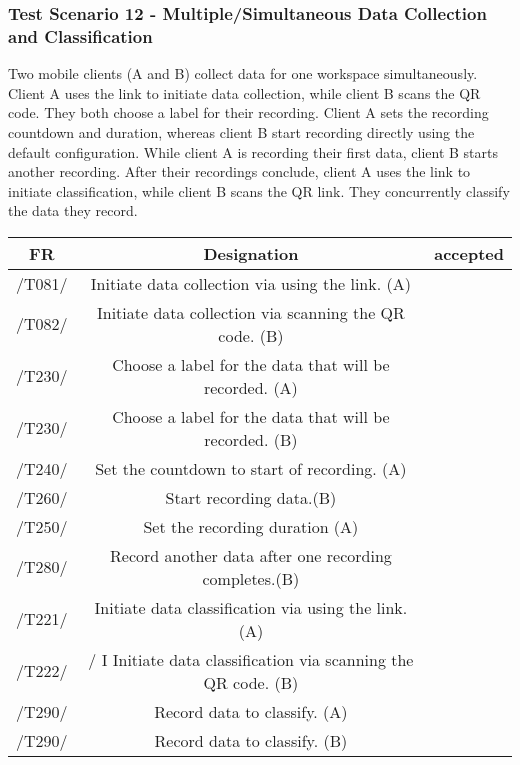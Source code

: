 \subsubsection{Test Scenario 12 - Multiple/Simultaneous Data Collection and
Classification}
Two mobile clients (A and B) collect data for one workspace simultaneously. Client A
uses the link to initiate data collection, while client B scans the QR code. They both
choose a label for their recording. Client A sets the recording countdown and duration,
whereas client B start recording directly using the default configuration. While client
A is recording their first data, client B starts another recording. After their recordings
conclude, client A uses the link to initiate classification, while client B scans the QR link.
They concurrently classify the data they record.
\begin{table}[h]
\begin{tabular}{!{\VRule}c!{\VRule}c!{\VRule}c!{\VRule}}
\hline
FR     & Designation                                                                    &accepted                \\
\hline
  /T081/  &  Initiate data collection via using the link. (A) &    \\
 \hline
  /T082/ &  Initiate data collection via scanning the QR code. (B)&    \\
 \hline
 /T230/   &  Choose a label for the data that will be recorded. (A) &   \\
 \hline
  /T230/   & Choose a label for the data that will be recorded. (B) &    \\
 \hline
  /T240/    &  Set the countdown to start of recording. (A) &    \\
 \hline
 /T260/  &  Start recording data.(B) &    \\
 \hline
  /T250/  &  Set the recording duration (A) &    \\
 \hline
  /T280/   &  Record another data after one recording completes.(B) &    \\
 \hline
 /T221/  &    Initiate data classification via using the link. (A)
 &    \\
 \hline
 /T222/  &   / I Initiate data classification via scanning the QR code. (B)

 &    \\
 \hline
 /T290/  &   Record data to classify. (A)&    \\
  \hline
  /T290/  &   Record data to classify. (B)&    \\
  \hline
\end{tabular}
\end{table}